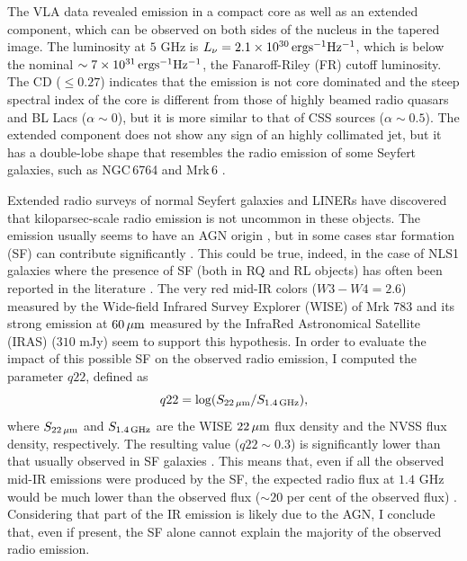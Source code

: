 \documentclass[../thesis.tex]{subfiles}
\begin{document}
The VLA data revealed emission in a compact core as well as an extended component, which can be observed on both sides of the nucleus in the tapered image.
The luminosity at $5$ GHz is $L_{\nu}=2.1\times10^{30}\,{\rm erg s^{-1} Hz^{-1}}$, which is below the nominal $\sim 7\times10^{31}\,{\rm erg s^{-1} Hz^{-1}}$, the Fanaroff-Riley (FR) cutoff luminosity. 
The CD ($\leq 0.27$) indicates that the emission is not core dominated and the steep spectral index of the core is different from those of highly beamed radio quasars and BL Lacs ($\alpha \sim 0$), but it is more similar to that of CSS sources ($\alpha \sim 0.5$).
The extended component does not show any sign of an highly collimated jet, but it has a double-lobe shape that resembles the radio emission of some Seyfert galaxies, such as NGC\,6764 \citep{Hota06} and Mrk\,6 \citep{Kharb06}.

Extended radio surveys of normal Seyfert galaxies and LINERs \citep[e.g.,][]{Baum93,Gallimore06,Singh15} have discovered that kiloparsec-scale radio emission is not uncommon in these objects. 
The emission usually seems to have an AGN origin \citep{Gallimore06,Singh15}, but in some cases star formation (SF) can  contribute significantly \citep[e.g.,][]{Baum93}.
This could be true, indeed, in the case of NLS1 galaxies where the presence of SF (both in RQ and RL objects) has often been reported in the literature \citep[e.g.,][]{Sani10,Caccianiga15}.
The very red mid-IR colors ($W3-W4=2.6$) measured by the Wide-field Infrared Survey Explorer (WISE) of Mrk 783 and its strong emission at $60\,{\rm\mu m}$ measured by the InfraRed Astronomical Satellite (IRAS) ($310$ mJy) seem to support this hypothesis. 
In order to evaluate the impact of this possible SF on the observed radio emission, I computed the parameter $q22$, defined as\begin{equation}
\label{eq:q22}
q22 = \log (S_{22\,{\rm \mu m}}/S_{1.4\,{\rm GHz}}),
\end{equation}
where $S_{22\,{\rm \mu m}}$ and $S_{1.4\,{\rm GHz}}$ are the WISE $22\,{\rm \mu m}$ flux density and the NVSS flux density, respectively.
The resulting value ($q22\sim0.3$) is significantly lower than that usually observed in SF galaxies \citep[$q22>1$;][]{Caccianiga15}. 
This means that, even if all the observed mid-IR emissions were produced by the SF, the expected radio flux at $1.4$ GHz would be much lower than the observed flux ($\sim20$ per cent of the observed flux) . 
Considering that part of the IR emission is likely due to the AGN, I conclude that, even if present, the SF alone cannot explain the majority of the observed radio emission.
\end{document}
